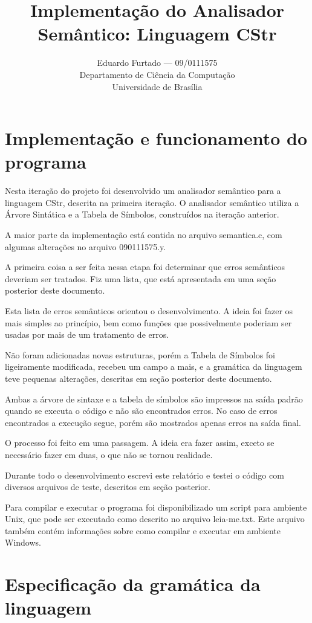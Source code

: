 \documentclass[12pt]{article}
\title{Implementação do Analisador Semântico: Linguagem CStr}
\author{Eduardo Furtado --- 09/0111575\\Departamento de Ciência da Computação\\Universidade de Brasília}
\begin{document}
\maketitle

\section{Implementação e funcionamento do programa}

\indent

Nesta iteração do projeto foi desenvolvido um analisador semântico para a linguagem CStr, descrita na primeira iteração. O analisador semântico utiliza a Árvore Sintática e a Tabela de Símbolos, construídos na iteração anterior.

A maior parte da implementação está contida no arquivo semantica.c, com algumas alterações no arquivo 090111575.y.

A primeira coisa a ser feita nessa etapa foi determinar que erros semânticos deveriam ser tratados. Fiz uma lista, que está apresentada em uma seção posterior deste documento.

Esta lista de erros semânticos orientou o desenvolvimento. A ideia foi fazer os mais simples ao princípio, bem como funções que possivelmente poderiam ser usadas por mais de um tratamento de erros.

Não foram adicionadas novas estruturas, porém a Tabela de Símbolos foi ligeiramente modificada, recebeu um campo a mais, e a gramática da linguagem teve pequenas alterações, descritas em seção posterior deste documento.

Ambas a árvore de sintaxe e a tabela de símbolos são impressos na saída padrão quando se executa o código e não são encontrados erros. No caso de erros encontrados a execução segue, porém são mostrados apenas erros na saída final.

O processo foi feito em uma passagem. A ideia era fazer assim, exceto se necessário fazer em duas, o que não se tornou realidade.

Durante todo o desenvolvimento escrevi este relatório e testei o código com diversos arquivos de teste, descritos em seção posterior.

Para compilar e executar o programa foi disponibilizado um script para ambiente Unix, que pode ser executado como descrito no arquivo leia-me.txt. Este arquivo também contém informações sobre como compilar e executar em ambiente Windows.

\section{Especificação da gramática da linguagem}
\end{document}
